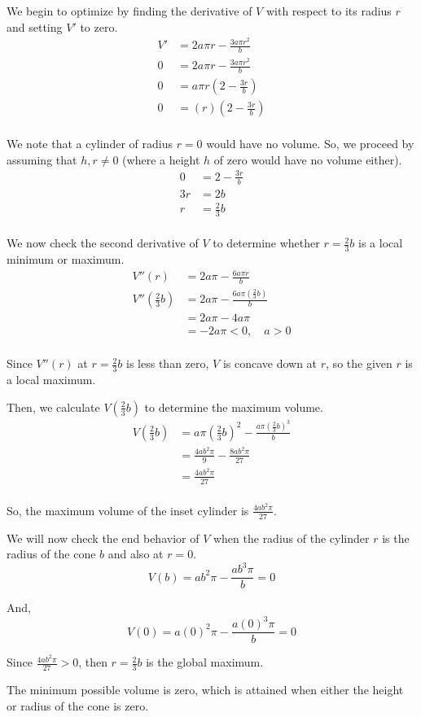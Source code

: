 \documentclass[../hw4.tex]{subfiles}
\begin{document}
We begin to optimize by finding the derivative of $V$ with respect to its radius $r$ and setting $V'$ to zero.
\begin{align*}
    V' &= 2a\pi r - \frac{3a \pi r^2}{b} \\
    0 &= 2a\pi r - \frac{3a \pi r^2}{b} \\
    0 &= a \pi r\left( 2-\frac{3r}{b} \right) \\
    0 &= (r)\left( 2-\frac{3r}{b} \right) \\
\end{align*}

We note that a cylinder of radius $r=0$ would have no volume. So, we proceed by assuming that $h,r\neq0$ (where a height $h$ of zero would have no volume either).
\begin{align*}
    0 &= 2-\frac{3r}{b} \\
    3r &= 2b \\
    r &= \frac{2}{3}b \\
\end{align*}

We now check the second derivative of $V$ to determine whether $r = \frac{2}{3}b$ is a local minimum or maximum.
\begin{align*}
    V''(r) &= 2a\pi-\frac{6a\pi r}{b} \\
    V''\left( \frac{2}{3}b \right) &= 2a\pi-\frac{6a\pi \left( \frac{2}{3}b \right)}{b} \\
    &= 2a\pi - 4a\pi \\
    &= -2a\pi < 0, \quad a>0 \\
\end{align*}

Since $V''(r)$ at $r = \frac{2}{3}b$ is less than zero, $V$ is concave down at $r$, so the given $r$ is a local maximum.

Then, we calculate $V\left( \frac{2}{3}b \right)$ to determine the maximum volume.
\begin{align*}
    V\left(\frac{2}{3}b\right) &= a\pi{\left(\frac{2}{3}b\right)}^2 - \frac{a\pi {\left( \frac{2}{3}b \right)}^3}{b} \\
    &= \frac{4ab^2\pi}{9} - \frac{8ab^2\pi}{27} \\
    &= \frac{4ab^2\pi}{27} \\
\end{align*}

So, the maximum volume of the inset cylinder is $\frac{4ab^2\pi}{27}$.

We will now check the end behavior of $V$ when the radius of the cylinder $r$ is the radius of the cone $b$ and also at $r=0$.
\[V(b) = a b^2 \pi - \frac{a b^3 \pi}{b} = 0\]

And, \[V(0) = a {(0)}^2 \pi - \frac{a{(0)}^3\pi}{b} = 0\]

Since $\frac{4ab^2\pi}{27}>0$, then $r=\frac{2}{3}b$ is the global maximum.

The minimum possible volume is zero, which is attained when either the height or radius of the cone is zero.
\end{document}
